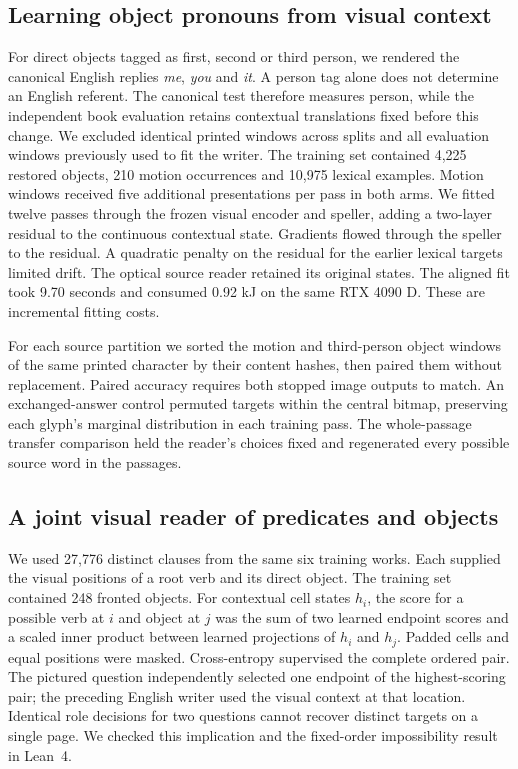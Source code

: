 \documentclass[12pt,a4paper]{article}
\providecommand{\DIFadd}[1]{{\protect\color{blue} \sf #1}} %
\begin{document}
\subsection*{\DIFadd{Learning object pronouns from visual context}}
\DIFadd{For direct objects tagged as first, second or third person, we rendered the canonical English replies \textit{me}, \textit{you} and \textit{it}. A person tag alone does not determine an English referent. The canonical test therefore measures person, while the independent book evaluation retains contextual translations fixed before this change. We excluded identical printed windows across splits and all evaluation windows previously used to fit the writer. The training set contained 4,225 restored objects, 210 motion occurrences and 10,975 lexical examples. Motion windows received five additional presentations per pass in both arms. We fitted twelve passes through the frozen visual encoder and speller, adding a two-layer residual to the continuous contextual state. Gradients flowed through the speller to the residual. A quadratic penalty on the residual for the earlier lexical targets limited drift. The optical source reader retained its original states. The aligned fit took 9.70 seconds and consumed 0.92 kJ on the same RTX 4090 D. These are incremental fitting costs.
}

\DIFadd{For each source partition we sorted the motion and third-person object windows of the same printed character by their content hashes, then paired them without replacement. Paired accuracy requires both stopped image outputs to match. An exchanged-answer control permuted targets within the central bitmap, preserving each glyph's marginal distribution in each training pass. The whole-passage transfer comparison held the reader's choices fixed and regenerated every possible source word in the passages.
}

\subsection*{\DIFadd{A joint visual reader of predicates and objects}}
\DIFadd{We used 27,776 distinct clauses from the same six training works. Each supplied the visual positions of a root verb and its direct object. The training set contained 248 fronted objects. For contextual cell states $h_i$, the score for a possible verb at $i$ and object at $j$ was the sum of two learned endpoint scores and a scaled inner product between learned projections of $h_i$ and $h_j$. Padded cells and equal positions were masked. Cross-entropy supervised the complete ordered pair. The pictured question independently selected one endpoint of the highest-scoring pair; the preceding English writer used the visual context at that location. Identical role decisions for two questions cannot recover distinct targets on a single page. We checked this implication and the fixed-order impossibility result in Lean~4.
}
\end{document}

